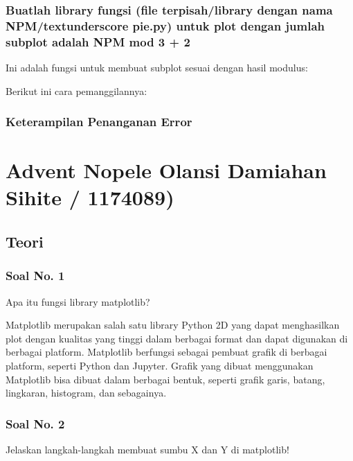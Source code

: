 \subsubsection{Buatlah library fungsi (file terpisah/library dengan nama NPM/textunderscore pie.py) untuk plot dengan jumlah subplot adalah NPM mod 3 + 2}

Ini adalah fungsi untuk membuat subplot sesuai dengan hasil modulus:


Berikut ini cara pemanggilannya:



\subsubsection{Keterampilan Penanganan Error}

\section{Advent Nopele Olansi Damiahan Sihite / 1174089)}
\subsection{Teori}
\subsubsection{Soal No. 1}
\hfill \break
Apa itu fungsi library matplotlib?

\hfill \break
Matplotlib merupakan salah satu library Python 2D yang dapat menghasilkan plot dengan kualitas yang tinggi dalam berbagai format dan dapat digunakan di berbagai platform. Matplotlib berfungsi sebagai pembuat grafik di berbagai platform, seperti Python dan Jupyter. Grafik yang dibuat menggunakan Matplotlib bisa dibuat dalam berbagai bentuk, seperti grafik garis, batang, lingkaran, histogram, dan sebagainya.

\subsubsection{Soal No. 2}
\hfill \break
Jelaskan langkah-langkah membuat sumbu X dan Y di matplotlib!

